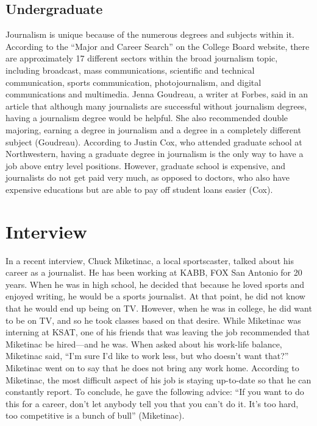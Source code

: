 \begin{multicols}{2}
    \subsection{Undergraduate}
Journalism is unique because of the numerous degrees and subjects within it. According to the “Major and Career Search” on the College Board website, there are approximately 17 different sectors within the broad journalism topic, including broadcast, mass communications, scientific and technical communication, sports communication, photojournalism, and digital communications and multimedia. Jenna Goudreau, a writer at Forbes, said in an article that although many journalists are successful without journalism degrees, having a journalism degree would be helpful. She also recommended double majoring, earning a degree in journalism and a degree in a completely different subject (Goudreau). According to Justin Cox, who attended graduate school at Northwestern, having a graduate degree in journalism is the only way to have a job above entry level positions. However, graduate school is expensive, and journalists do not get paid very much, as opposed to doctors, who also have expensive educations but are able to pay off student loans easier (Cox). 
\section{Interview}
    In a recent interview, Chuck Miketinac, a local sportscaster, talked about his career as a journalist. He has been working at KABB, FOX San Antonio for 20 years. When he was in high school, he decided that because he loved sports and enjoyed writing, he would be a sports journalist. At that point, he did not know that he would end up being on TV. However, when he was in college, he did want to be on TV, and so he took classes based on that desire. While Miketinac was interning at KSAT, one of his friends that was leaving the job recommended that Miketinac be hired—and he was. When asked about his work-life balance, Miketinac said, “I'm sure I'd like to work less, but who doesn't want that?” Miketinac went on to say that he does not bring any work home. According to Miketinac, the most difficult aspect of his job is staying up-to-date so that he can constantly report. To conclude, he gave the following advice: “If you want to do this for a career, don't let anybody tell you that you can't do it. It's too hard, too competitive is a bunch of bull” (Miketinac).

\end{multicols}
